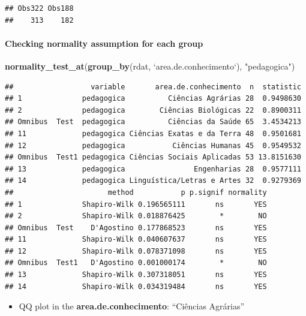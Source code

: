 \documentclass[]{article}
\newenvironment{Shaded}{\begin{snugshade}}{\end{snugshade}}
\newcommand{\DataTypeTok}[1]{\textcolor[rgb]{0.13,0.29,0.53}{#1}}
\newcommand{\KeywordTok}[1]{\textcolor[rgb]{0.13,0.29,0.53}{\textbf{#1}}}
\newcommand{\NormalTok}[1]{#1}
\newcommand{\StringTok}[1]{\textcolor[rgb]{0.31,0.60,0.02}{#1}}
\providecommand{\tightlist}{%
  \setlength{\itemsep}{0pt}\setlength{\parskip}{0pt}}
\let\oldparagraph\paragraph
\renewcommand{\paragraph}[1]{\oldparagraph{#1}\mbox{}}
\begin{document}
\begin{verbatim}
## Obs322 Obs188 
##    313    182
\end{verbatim}

\hypertarget{checking-normality-assumption-for-each-group}{%
\paragraph{Checking normality assumption for each
group}\label{checking-normality-assumption-for-each-group}}

\begin{Shaded}
\begin{Highlighting}[]
\KeywordTok{normality_test_at}\NormalTok{(}\KeywordTok{group_by}\NormalTok{(rdat, }\StringTok{`}\DataTypeTok{area.de.conhecimento}\StringTok{`}\NormalTok{), }\StringTok{"pedagogica"}\NormalTok{)}
\end{Highlighting}
\end{Shaded}

\begin{verbatim}
##                  variable       area.de.conhecimento  n  statistic
## 1              pedagogica          Ciências Agrárias 28  0.9498630
## 2              pedagogica        Ciências Biológicas 22  0.8900311
## Omnibus  Test  pedagogica          Ciências da Saúde 65  3.4534213
## 11             pedagogica Ciências Exatas e da Terra 48  0.9501681
## 12             pedagogica           Ciências Humanas 45  0.9549532
## Omnibus  Test1 pedagogica Ciências Sociais Aplicadas 53 13.8151630
## 13             pedagogica                Engenharias 28  0.9577111
## 14             pedagogica Linguística/Letras e Artes 32  0.9279369
##                      method           p p.signif normality
## 1              Shapiro-Wilk 0.196565111       ns       YES
## 2              Shapiro-Wilk 0.018876425        *        NO
## Omnibus  Test    D'Agostino 0.177868523       ns       YES
## 11             Shapiro-Wilk 0.040607637       ns       YES
## 12             Shapiro-Wilk 0.078371098       ns       YES
## Omnibus  Test1   D'Agostino 0.001000174        *        NO
## 13             Shapiro-Wilk 0.307318051       ns       YES
## 14             Shapiro-Wilk 0.034319484       ns       YES
\end{verbatim}

\begin{itemize}
\tightlist
\item
  QQ plot in the \textbf{area.de.conhecimento}: ``Ciências Agrárias''
\end{itemize}
\end{document}
